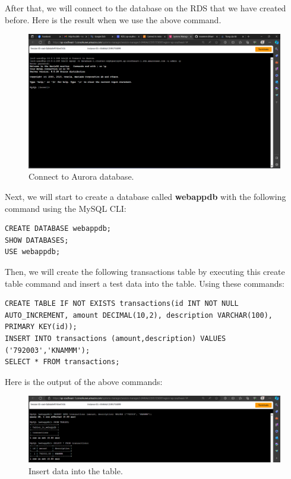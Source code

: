 \documentclass{article}
\begin{document}
\newpage
After that, we will connect to the database on the RDS that we have created before. Here is the result when we use the above command.\par
\begin{figure}[h]
    \centering
    \includegraphics[width=12cm]{Pictures/App-tier/Connect_Aurora.png}
    \caption{Connect to Aurora database.}
    \label{fig:enter-label}
\end{figure}

Next, we will start to create a database called \textbf{webappdb} with the following command using the MySQL CLI:\par
\begin{lstlisting}
CREATE DATABASE webappdb;   
SHOW DATABASES;
USE webappdb;    
\end{lstlisting}

Then, we will create the following transactions table by executing this create table command and insert a test data into the table. Using these commands:\par
\begin{lstlisting}
CREATE TABLE IF NOT EXISTS transactions(id INT NOT NULL AUTO_INCREMENT, amount DECIMAL(10,2), description VARCHAR(100), PRIMARY KEY(id));
INSERT INTO transactions (amount,description) VALUES ('792003','KNAMMM');   
SELECT * FROM transactions;
\end{lstlisting}

Here is the output of the above commands:\par
\begin{figure}[h]
    \centering
    \includegraphics[width=12cm]{Pictures/App-tier/Insert_DB.png}
    \caption{Insert data into the table.}
    \label{fig:enter-label}
\end{figure}
\end{document}
